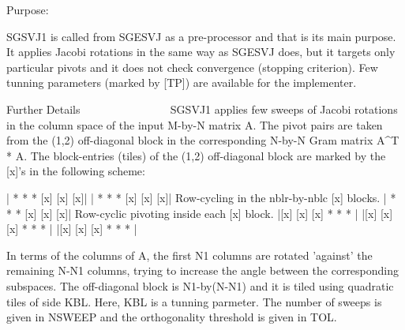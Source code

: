 \begin{DoxyParagraph}{Purpose\+: }
\begin{DoxyVerb} SGSVJ1 is called from SGESVJ as a pre-processor and that is its main
 purpose. It applies Jacobi rotations in the same way as SGESVJ does, but
 it targets only particular pivots and it does not check convergence
 (stopping criterion). Few tunning parameters (marked by [TP]) are
 available for the implementer.

 Further Details
 ~~~~~~~~~~~~~~~
 SGSVJ1 applies few sweeps of Jacobi rotations in the column space of
 the input M-by-N matrix A. The pivot pairs are taken from the (1,2)
 off-diagonal block in the corresponding N-by-N Gram matrix A^T * A. The
 block-entries (tiles) of the (1,2) off-diagonal block are marked by the
 [x]'s in the following scheme:

    | *  *  * [x] [x] [x]|
    | *  *  * [x] [x] [x]|    Row-cycling in the nblr-by-nblc [x] blocks.
    | *  *  * [x] [x] [x]|    Row-cyclic pivoting inside each [x] block.
    |[x] [x] [x] *  *  * |
    |[x] [x] [x] *  *  * |
    |[x] [x] [x] *  *  * |

 In terms of the columns of A, the first N1 columns are rotated 'against'
 the remaining N-N1 columns, trying to increase the angle between the
 corresponding subspaces. The off-diagonal block is N1-by(N-N1) and it is
 tiled using quadratic tiles of side KBL. Here, KBL is a tunning parmeter.
 The number of sweeps is given in NSWEEP and the orthogonality threshold
 is given in TOL.\end{DoxyVerb}
 
\end{DoxyParagraph}

